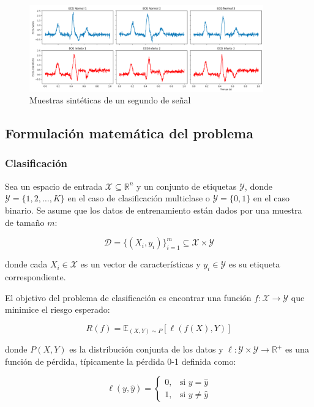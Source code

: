 \documentclass[titlepage,a4paper]{article}
\begin{document}
\begin{figure}[h] %
    \centering
    \includegraphics[width=0.9\textwidth]{muestras_sinteticas.png} %
    \caption{Muestras sintéticas de un segundo de señal}
    \label{fig:mi_figura} %
\end{figure}


\subsection{Formulación matemática del problema}
\subsubsection{Clasificación}
Sea un espacio de entrada \( \mathcal{X} \subseteq \mathbb{R}^n \) y un conjunto de etiquetas \( \mathcal{Y} \), donde \( \mathcal{Y} = \{1, 2, \dots, K\} \) en el caso de clasificación multiclase o \( \mathcal{Y} = \{0,1\} \) en el caso binario. Se asume que los datos de entrenamiento están dados por una muestra de tamaño \( m \):

\[
\mathcal{D} = \{(X_i, y_i)\}_{i=1}^{m} \subseteq \mathcal{X} \times \mathcal{Y}
\]

donde cada \( X_i \in \mathcal{X} \) es un vector de características y \( y_i \in \mathcal{Y} \) es su etiqueta correspondiente.

El objetivo del problema de clasificación es encontrar una función \( f: \mathcal{X} \to \mathcal{Y} \) que minimice el riesgo esperado:

\[
R(f) = \mathbb{E}_{(X,Y) \sim P} [\ell(f(X), Y)]
\]

donde \( P(X,Y) \) es la distribución conjunta de los datos y \( \ell: \mathcal{Y} \times \mathcal{Y} \to \mathbb{R}^+ \) es una función de pérdida, típicamente la pérdida 0-1 definida como:

\[
\ell(y, \hat{y}) =
\begin{cases}
    0, & \text{si } y = \hat{y} \\
    1, & \text{si } y \neq \hat{y}
\end{cases}
\]
\end{document}
